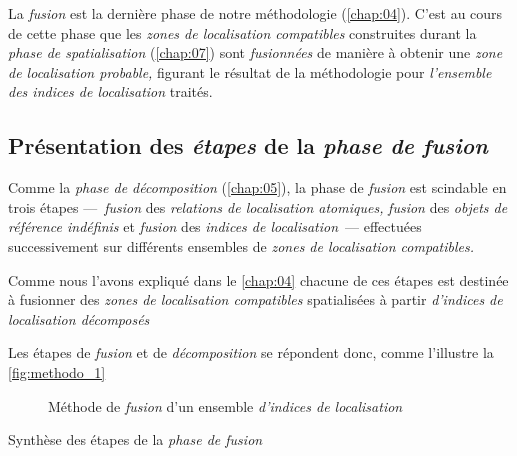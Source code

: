 La \emph{fusion} est la dernière phase de notre méthodologie
(\autoref{chap:04}). C'est au cours de cette phase que les \emph{zones
  de localisation compatibles} construites durant la \emph{phase de
  spatialisation} (\autoref{chap:07}) sont \emph{fusionnées} de
manière à obtenir une \emph{zone de localisation probable,} figurant
le résultat de la méthodologie pour \emph{l'ensemble des indices de
  localisation} traités.

\subsection{Présentation des \emph{étapes} de la \emph{phase de
    fusion}}

Comme la \emph{phase de décomposition} (\autoref{chap:05}), la phase
de \emph{fusion} est scindable en trois étapes ---~\emph{fusion} des
\emph{relations de localisation atomiques,} \emph{fusion} des
\emph{objets de référence indéfinis} et \emph{fusion} des
\emph{indices de localisation}~--- effectuées successivement sur
différents ensembles de \emph{zones de localisation compatibles.}

Comme nous l'avons expliqué dans le \autoref{chap:04} chacune de ces
étapes est destinée à fusionner des \emph{zones de localisation
  compatibles} spatialisées à partir \emph{d'indices de localisation
  décomposés}

Les étapes de \emph{fusion} et de \emph{décomposition} se répondent
donc, comme l'illustre la \autoref{fig:methodo_1}



\begin{figure}
  \centering
  
  \caption{Méthode de \emph{fusion} d'un ensemble \emph{d'indices de localisation}}
  \label{fig:methodo_fusion}
\end{figure}



\begin{table}
  \centering
   
   \caption{Synthèse des étapes de la \emph{phase de fusion}}
  \label{tab:comparaison_etapes_fusion}
\end{table}

